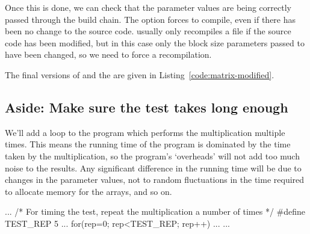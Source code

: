 \documentclass[a4paper]{article}
\begin{document}
Once this is done, we can check that the parameter values are being correctly 
passed through the build chain. The  option forces 
 to compile, even if there has been no change to the source 
code.  usually only recompiles a file if the source code has been 
modified, but in this case only the block size parameters passed to 
 have been changed, so we need to force a recompilation.
\begin{Term}
\end{Term}

The final versions of  and the  are 
given in Listing~\ref{code:matrix-modified}.





\subsection{Aside: Make sure the test takes long enough}

We'll add a loop to the program which performs the multiplication 
multiple times. This means the running time of the program is dominated by 
the time taken by the multiplication, so the program's `overheads' will not 
add too much noise to the results. Any significant difference in the running 
time will be due to changes in the parameter values, not to random fluctuations 
in the time required to allocate memory for the arrays, and so on.
\begin{Code}[numbers=none]
...
/* For timing the test, repeat the multiplication a number of times */
#define TEST_REP 5
...
    for(rep=0; rep<TEST_REP; rep++){
        ...
    }
...
\end{Code}
\end{document}
